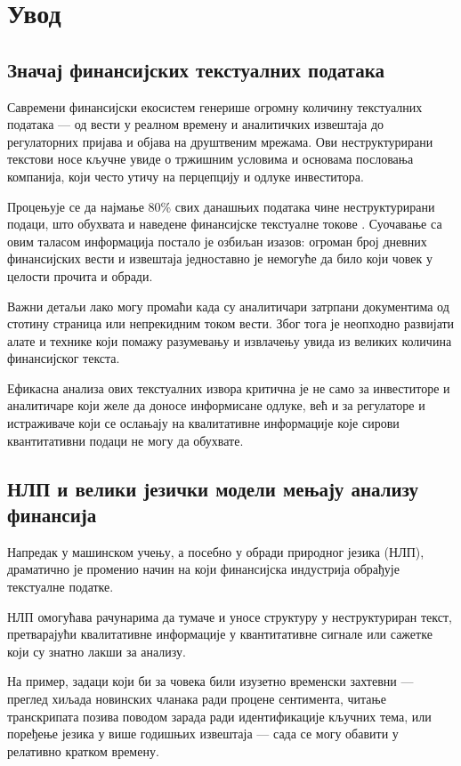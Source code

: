 \chapter{Увод}
\label{sec:1}

\section{Значај финансијских текстуалних података}

Савремени финансијски екосистем генерише огромну количину текстуалних података — од вести у реалном времену и аналитичких извештаја до регулаторних пријава и објава на друштвеним мрежама. Ови неструктурирани текстови носе кључне увиде о тржишним условима и основама пословања компанија, који често утичу на перцепцију и одлуке инвеститора. 

Процењује се да најмање 80\% свих данашњих података чине неструктурирани подаци, што обухвата и наведене финансијске текстуалне токове \cite{rocha_discovering_2021}. Суочавање са овим таласом информација постало је озбиљан изазов: огроман број дневних финансијских вести и извештаја једноставно је немогуће да било који човек у целости прочита и обради. 

Важни детаљи лако могу промаћи када су аналитичари затрпани документима од стотину страница или непрекидним током вести. Због тога је неопходно развијати алате и технике који помажу разумевању и извлачењу увида из великих количина финансијског текста. 

Ефикасна анализа ових текстуалних извора критична је не само за инвеститоре и аналитичаре који желе да доносе информисане одлуке, већ и за регулаторе и истраживаче који се ослањају на квалитативне информације које сирови квантитативни подаци не могу да обухвате.

\section{НЛП и велики језички модели мењају анализу финансија}

Напредак у машинском учењу, а посебно у обради природног језика (НЛП), драматично је променио начин на који финансијска индустрија обрађује текстуалне податке. 

НЛП омогућава рачунарима да тумаче и уносе структуру у неструктуриран текст, претварајући квалитативне информације у квантитативне сигнале или сажетке који су знатно лакши за анализу. 

На пример, задаци који би за човека били изузетно временски захтевни — преглед хиљада новинских чланака ради процене сентимента, читање транскрипата позива поводом зарада ради идентификације кључних тема, или поређење језика у више годишњих извештаја — сада се могу обавити у релативно кратком времену. 

